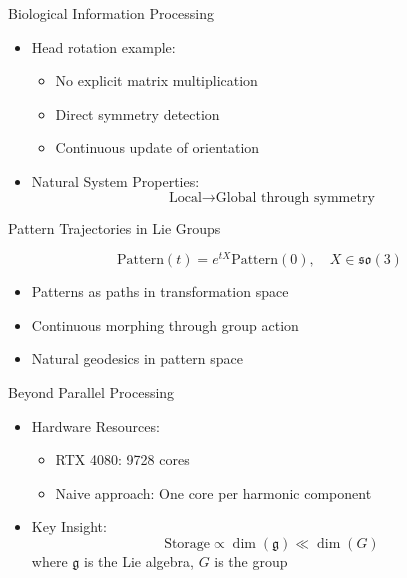 \documentclass{beamer}
\begin{document}
\begin{frame}{Biological Information Processing}
\begin{itemize}
\item Head rotation example:
\begin{itemize}
\item No explicit matrix multiplication
\item Direct symmetry detection
\item Continuous update of orientation
\end{itemize}
\pause
\item Natural System Properties:
\begin{equation*}
\text{Local} \rightarrow \text{Global} \text{ through symmetry}
\end{equation*}
\end{itemize}
\end{frame}
\begin{frame}{Pattern Trajectories in Lie Groups}
\begin{center}
\end{center}
\begin{equation*}
\text{Pattern}(t) = e^{tX}\text{Pattern}(0), \quad X \in \mathfrak{so}(3)
\end{equation*}
\begin{itemize}
\item Patterns as paths in transformation space
\item Continuous morphing through group action
\item Natural geodesics in pattern space
\end{itemize}
\end{frame}
\begin{frame}{Beyond Parallel Processing}
\begin{itemize}
\item Hardware Resources:
\begin{itemize}
\item RTX 4080: 9728 cores
\item Naive approach: One core per harmonic component
\end{itemize}
\pause
\item Key Insight:
\begin{equation*}
\text{Storage} \propto \dim(\mathfrak{g}) \ll \dim(G)
\end{equation*}
where $\mathfrak{g}$ is the Lie algebra, $G$ is the group
\end{itemize}
\end{frame}
\end{document}
